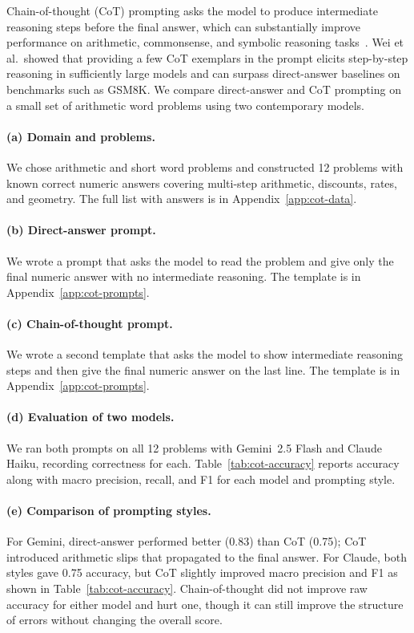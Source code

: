 Chain-of-thought (CoT) prompting asks the model to produce intermediate reasoning steps before the final answer, which can substantially improve performance on arithmetic, commonsense, and symbolic reasoning tasks~\cite{wei2022chain}. Wei et al.\ showed that providing a few CoT exemplars in the prompt elicits step-by-step reasoning in sufficiently large models and can surpass direct-answer baselines on benchmarks such as GSM8K. We compare direct-answer and CoT prompting on a small set of arithmetic word problems using two contemporary models.

\paragraph{(a) Domain and problems.}
We chose arithmetic and short word problems and constructed 12 problems with known correct numeric answers covering multi-step arithmetic, discounts, rates, and geometry. The full list with answers is in Appendix~\ref{app:cot-data}.

\paragraph{(b) Direct-answer prompt.}
We wrote a prompt that asks the model to read the problem and give only the final numeric answer with no intermediate reasoning. The template is in Appendix~\ref{app:cot-prompts}.

\paragraph{(c) Chain-of-thought prompt.}
We wrote a second template that asks the model to show intermediate reasoning steps and then give the final numeric answer on the last line. The template is in Appendix~\ref{app:cot-prompts}.

\paragraph{(d) Evaluation of two models.}
We ran both prompts on all 12 problems with Gemini~2.5 Flash and Claude Haiku, recording correctness for each. Table~\ref{tab:cot-accuracy} reports accuracy along with macro precision, recall, and F1 for each model and prompting style.

\paragraph{(e) Comparison of prompting styles.}
For Gemini, direct-answer performed better (0.83) than CoT (0.75); CoT introduced arithmetic slips that propagated to the final answer. For Claude, both styles gave 0.75 accuracy, but CoT slightly improved macro precision and F1 as shown in Table~\ref{tab:cot-accuracy}. Chain-of-thought did not improve raw accuracy for either model and hurt one, though it can still improve the structure of errors without changing the overall score.

